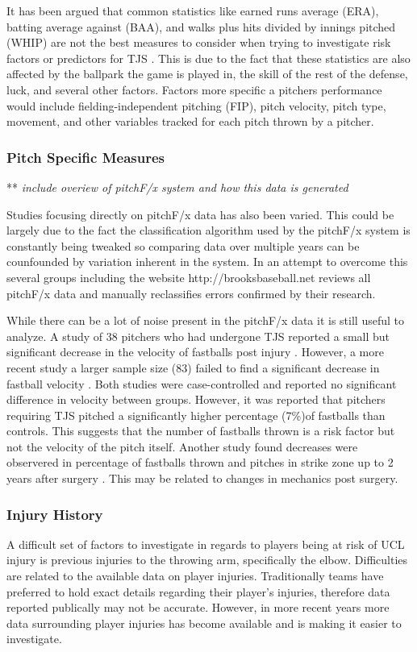 It has been argued that common statistics like earned runs average (ERA), batting average against (BAA), and walks plus hits divided by innings pitched (WHIP) are not the best measures to consider when trying to investigate risk factors or predictors for TJS \cite{Gray2014}. This is due to the fact that these statistics are also affected by the ballpark the game is played in, the skill of the rest of the defense, luck, and several other factors. Factors more specific a pitchers performance would include fielding-independent pitching (FIP), pitch velocity, pitch type, movement, and other variables tracked for each pitch thrown by a pitcher.

\subsubsection{Pitch Specific Measures}

** \emph{include overiew of pitchF/x system and how this data is generated}

Studies focusing directly on pitchF/x data has also been varied. This could be largely due to the fact the classification algorithm used by the pitchF/x system is constantly being tweaked so comparing data over multiple years can be counfounded by variation inherent in the system. In an attempt to overcome this several groups including the website http://brooksbaseball.net reviews all pitchF/x data and manually reclassifies errors confirmed by their research.

While there can be a lot of noise present in the pitchF/x data it is still useful to analyze. A study of 38 pitchers who had undergone TJS reported a small but significant decrease in the velocity of fastballs post injury \cite{Jiang2014}. However, a more recent study a larger sample size (83) failed to find a significant decrease in fastball velocity \cite{Keller2016}. Both studies were case-controlled and reported no significant difference in velocity between groups. However, it was reported that pitchers requiring TJS pitched a significantly higher percentage (7\%)of fastballs than controls. This suggests that the number of fastballs thrown is a risk factor but not the velocity of the pitch itself. \cite{Keller2016} Another study found decreases were observered in percentage of fastballs thrown and pitches in strike zone up to 2 years after surgery \cite{Makhni2014}. This may be related to changes in mechanics post surgery.

\subsubsection{Injury History}
A difficult set of factors to investigate in regards to players being at risk of UCL injury is previous injuries to the throwing arm, specifically the elbow. Difficulties are related to the available data on player injuries. Traditionally teams have preferred to hold exact details regarding their player's injuries, therefore data reported publically may not be accurate. However, in more recent years more data surrounding player injuries has become available and is making it easier to investigate.


